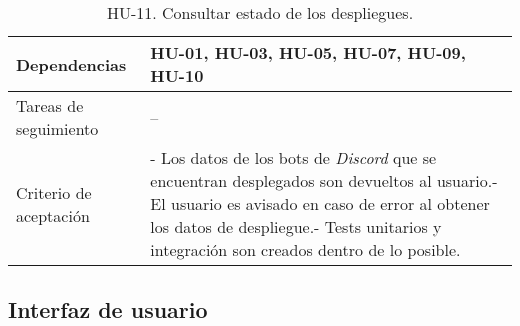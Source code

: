 \begin{table}[H]
\begin{adjustbox}{max width=\textwidth}
\begin{tabularx}{\textwidth}{l|L}
        Dependencias & HU-01, HU-03, HU-05, HU-07, HU-09, HU-10 \\ \hline
        Tareas de seguimiento & – \\ \hline
        Criterio de aceptación & - Los datos de los bots de \textit{Discord} que se encuentran desplegados son devueltos al usuario.\linebreak - El usuario es avisado en caso de error al obtener los datos de despliegue.\linebreak - Tests unitarios y integración son creados dentro de lo posible. \\ \hline
    \end{tabularx}
    \end{adjustbox}
    \caption{HU-11. Consultar estado de los despliegues.}
\end{table}

\subsection{Interfaz de usuario}

